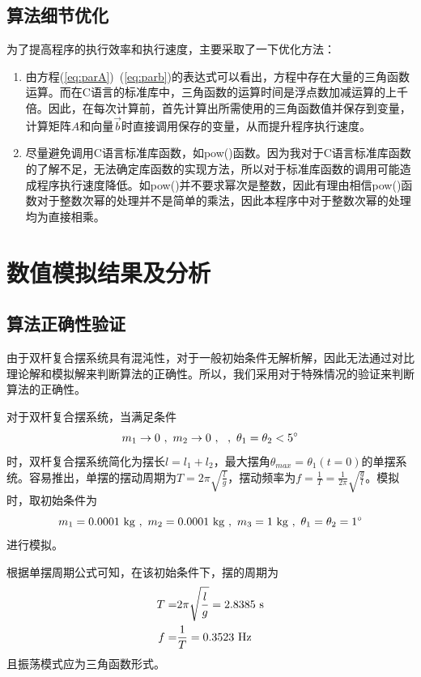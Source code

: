 \documentclass[a4paper,12pt,titlepage]{article}
\begin{document}
\subsection{算法细节优化}
为了提高程序的执行效率和执行速度，主要采取了一下优化方法：
\begin{enumerate}
	\item 由方程(\ref{eq:parA})~(\ref{eq:parb})的表达式可以看出，方程中存在大量的三角函数运算。而在C语言的标准库中，三角函数的运算时间是浮点数加减运算的上千倍。因此，在每次计算前，首先计算出所需使用的三角函数值并保存到变量，计算矩阵$A$和向量$\vec{b}$时直接调用保存的变量，从而提升程序执行速度。
	\item 尽量避免调用C语言标准库函数，如pow()函数。因为我对于C语言标准库函数的了解不足，无法确定库函数的实现方法，所以对于标准库函数的调用可能造成程序执行速度降低。如pow()并不要求幂次是整数，因此有理由相信pow()函数对于整数次幂的处理并不是简单的乘法，因此本程序中对于整数次幂的处理均为直接相乘。
\end{enumerate}


\section{数值模拟结果及分析}
\subsection{算法正确性验证}
由于双杆复合摆系统具有混沌性，对于一般初始条件无解析解，因此无法通过对比理论解和模拟解来判断算法的正确性。所以，我们采用对于特殊情况的验证来判断算法的正确性。

对于双杆复合摆系统，当满足条件
\begin{equation}
	 m_1\rightarrow 0 ~,~ m_2\rightarrow 0 ~,~  ~,~ \theta_1=\theta_2<5^{\circ} \notag
\end{equation}
时，双杆复合摆系统简化为摆长$l=l_1+l_2$，最大摆角$\theta_{max}=\theta_1(t=0)$的单摆系统。容易推出，单摆的摆动周期为$T=2\pi\sqrt{\frac{l}{g}}$，摆动频率为$f=\frac{1}{T}=\frac{1}{2\pi}\sqrt{\frac{g}{l}}$。模拟时，取初始条件为
\begin{equation}
	m_1=0.0001~\mathrm{kg} ~,~ m_2=0.0001~\mathrm{kg} ~,~ m_3=1~\mathrm{kg} ~,~ \theta_1=\theta_2=1^{\circ} \notag
\end{equation}
进行模拟。

根据单摆周期公式可知，在该初始条件下，摆的周期为
\begin{align}
	T=&2\pi\sqrt{\frac{l}{g}}=2.8385~\mathrm{s} \notag \\
	f=&\frac{1}{T}=0.3523~\mathrm{Hz} \notag
\end{align}
且振荡模式应为三角函数形式。
\end{document}
